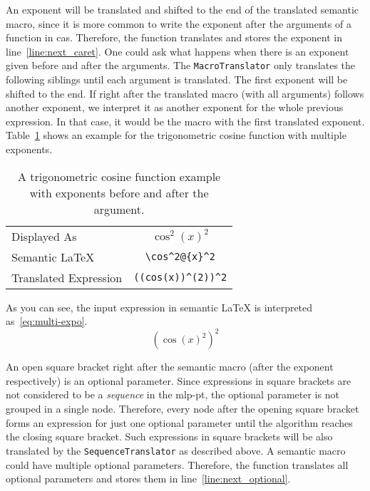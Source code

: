 An exponent will be translated and shifted to the end of the translated semantic macro, since it is more common to write the exponent after the arguments of a function in \gls{cas}. Therefore, the function translates and stores the exponent in line~\ref{line:next_caret}. One could ask what happens when there is an exponent given before and after the arguments. The \verb|MacroTranslator| only translates the following siblings until each argument is translated. The first exponent will be shifted to the end. If right after the translated macro (with all arguments) follows another exponent, we interpret it as another exponent for the whole previous expression. In that case, it would be the macro with the first translated exponent. Table~\ref{tab:multi-expo} shows an example for the trigonometric cosine function with multiple exponents. 
\begin{table}[ht]
\centering
\begin{tabular}{lc}
\hline
Displayed As & \rule{0pt}{0.9\normalbaselineskip} $\cos^2(x)^2$ \\
Semantic \LaTeX & \verb|\cos^2@{x}^2| \\
Translated \Maple{} Expression & \verb|((cos(x))^(2))^2|\\
\hline
\end{tabular}
\caption{A trigonometric cosine function example with exponents before and after the argument.}
\label{tab:multi-expo}
\end{table}

As you can see, the input expression in semantic \LaTeX{} is interpreted as~\eqref{eq:multi-expo}.
\begin{equation}\label{eq:multi-expo}
\left( \cos(x)^2 \right)^2
\end{equation}

An open square bracket right after the semantic macro (after the exponent respectively) is an optional parameter. Since expressions in square brackets are not considered to be a \textit{sequence} in the \gls{mlp-pt}, the optional parameter is not grouped in a single node. Therefore, every node after the opening square bracket forms an expression for just one optional parameter until the algorithm reaches the closing square bracket. Such expressions in square brackets will be also translated by the \verb|SequenceTranslator| as described above. A semantic macro could have multiple optional parameters. Therefore, the function translates all optional parameters and stores them in line~\ref{line:next_optional}.


